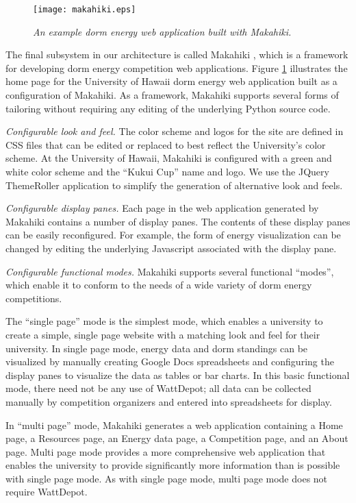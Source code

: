 \begin{figure}[!th]
  \center
  \texttt{[image: makahiki.eps]}
  \caption{\em \small An example dorm energy web application built with Makahiki.}
  \label{fig:makahiki}
\end{figure} 

The final subsystem in our architecture is called Makahiki \cite{makahiki-site}, which is a
framework for developing dorm energy competition web applications.  Figure
\ref{fig:makahiki} illustrates the home page for the University of Hawaii
dorm energy web application built as a configuration of Makahiki. As a
framework, Makahiki supports several forms of tailoring without requiring
any editing of the underlying Python source code.

{\em Configurable look and feel.} The color scheme and logos for the site
are defined in CSS files that can be edited or replaced to best reflect the
University's color scheme. At the University of Hawaii, Makahiki is
configured with a green and white color scheme and the ``Kukui Cup'' name
and logo.   We use the JQuery ThemeRoller application to simplify the generation of 
alternative look and feels.

{\em Configurable display panes.} Each page in the web application generated by Makahiki
contains a number of display panes. The contents of these display panes can be easily 
reconfigured. For example, the form of energy visualization can be changed by editing 
the underlying Javascript associated with the display pane. 

{\em Configurable functional modes.}  Makahiki supports several functional ``modes'', which 
enable it to conform to the needs of a wide variety of dorm energy competitions.  

The ``single page'' mode is the simplest mode, which enables a university
to create a simple, single page website with a matching look and feel for
their university.  In single page mode, energy data and dorm standings can
be visualized by manually creating Google Docs spreadsheets and configuring
the display panes to visualize the data as tables or bar charts.  In this
basic functional mode, there need not be any use of WattDepot; all data can
be collected manually by competition organizers and entered into
spreadsheets for display.

In ``multi page'' mode, Makahiki generates a web application containing a
Home page, a Resources page, an Energy data page, a Competition page, and
an About page.  Multi page mode provides a more comprehensive web
application that enables the university to provide significantly more
information than is possible with single page mode.  As with single page
mode, multi page mode does not require WattDepot.

